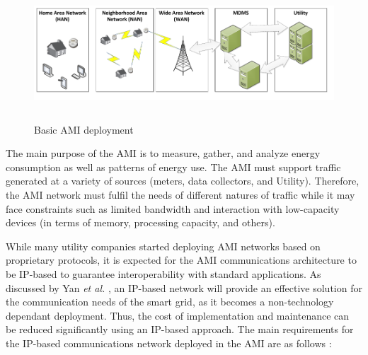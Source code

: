 \documentclass[11pt,draftclsnofoot,onecolumn]{IEEEtran}
\begin{document}
\begin{figure}[htp!]
\centering
\includegraphics [height=5cm] {AMI_ARCHITECTURE}
\caption{Basic AMI deployment}
\label{fig:ami}
\end{figure}

The main purpose of the AMI is to measure, gather, and analyze energy consumption as well as patterns of energy use.  The AMI must support  traffic generated at a variety of sources (meters, data collectors, and Utility). Therefore, the AMI network must fulfil %
the needs of different natures of traffic while it may face constraints such as limited bandwidth and interaction with low-capacity devices (in terms of memory, processing capacity, and others).

While many utility companies started deploying AMI networks based on proprietary protocols, it is expected for the AMI communications architecture to be IP-based to guarantee interoperability with standard applications. As discussed by Yan \textit{et al.} \cite{Yan2013}, an IP-based network will provide an effective solution for the communication needs of the smart grid, as it becomes a non-technology dependant deployment.  Thus, the cost of implementation and maintenance can be reduced significantly using an IP-based approach. The main requirements for the IP-based communications network deployed in the AMI are as follows \cite{Wang2011b} \cite{Iyer2011a}:
\end{document}
